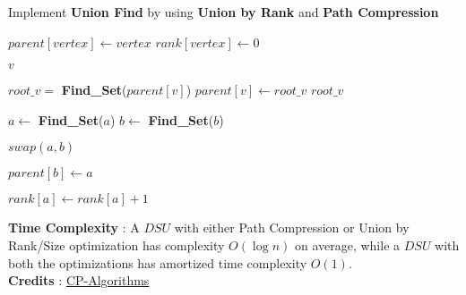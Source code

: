 \documentclass[12pt]{article}
\begin{document}
\begin{algorithm}

  \caption{Implement \textbf{Union Find} by using \textbf{Union by Rank} and \textbf{Path Compression}}
  
  \begin{algorithmic}[1]
        \State $parent[vertex] \gets vertex$
        \State $rank[vertex] \gets 0$ 
    \EndProcedure
    
    \Statex
    \Statex
    
            \State \Return $v$
        \EndIf
        
        \Statex
        \State $root\_v =$ \textbf{Find\_Set}($parent[v]$)
        \State $parent[v] \gets root\_v$ 
        \State \Return $root\_v$
    \EndProcedure
    
    \Statex
    \Statex
    
        \State $a \gets$ \textbf{Find\_Set}($a$) 
        \State $b \gets$ \textbf{Find\_Set}($b$) 
        
        \Statex
        
             
                \State $swap(a,b)$
            \EndIf
            
            \State $parent[b] \gets a$ 
            
             
                \State $rank[a] \gets rank[a] + 1$
            \EndIf
        \EndIf
    \EndProcedure
  \end{algorithmic}

\end{algorithm}

\noindent
\textbf{Time Complexity} : A $DSU$ with either Path Compression or Union by Rank/Size optimization has complexity $O(\log{} n)$ on average, while a $DSU$ with both the optimizations has amortized time complexity $O(1)$.  \\

\noindent
\textbf{Credits} : \href{https://cp-algorithms.com/data_structures/disjoint_set_union.html}{CP-Algorithms}
\end{document}
